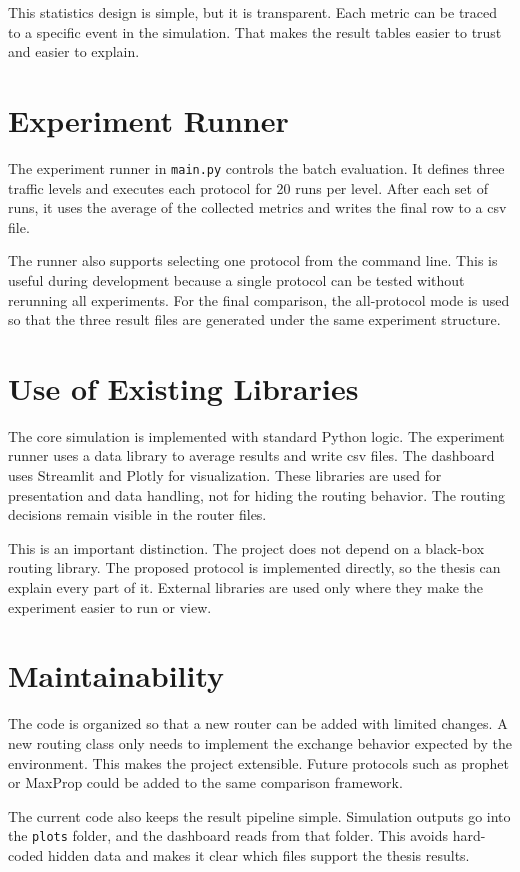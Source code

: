 This statistics design is simple, but it is transparent. Each metric can be traced to a specific event in the simulation. That makes the result tables easier to trust and easier to explain.

\section{Experiment Runner}
The experiment runner in \verb|main.py| controls the batch evaluation. It defines three traffic levels and executes each protocol for 20 runs per level. After each set of runs, it uses the average of the collected metrics and writes the final row to a \ac{csv} file.

The runner also supports selecting one protocol from the command line. This is useful during development because a single protocol can be tested without rerunning all experiments. For the final comparison, the all-protocol mode is used so that the three result files are generated under the same experiment structure.

\section{Use of Existing Libraries}
The core simulation is implemented with standard Python logic. The experiment runner uses a data library to average results and write \ac{csv} files. The dashboard uses Streamlit and Plotly for visualization. These libraries are used for presentation and data handling, not for hiding the routing behavior. The routing decisions remain visible in the router files.

This is an important distinction. The project does not depend on a black-box routing library. The proposed protocol is implemented directly, so the thesis can explain every part of it. External libraries are used only where they make the experiment easier to run or view.

\section{Maintainability}
The code is organized so that a new router can be added with limited changes. A new routing class only needs to implement the exchange behavior expected by the environment. This makes the project extensible. Future protocols such as \ac{prophet} or MaxProp could be added to the same comparison framework.

The current code also keeps the result pipeline simple. Simulation outputs go into the \verb|plots| folder, and the dashboard reads from that folder. This avoids hard-coded hidden data and makes it clear which files support the thesis results.
